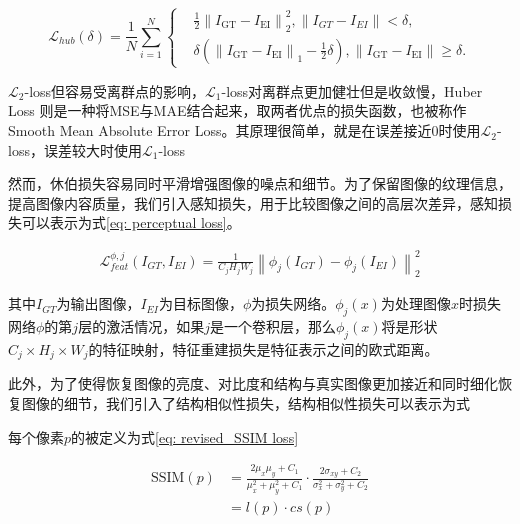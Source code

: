 \documentclass[a4paper]{ctexart}
\begin{document}
\begin{equation}
	\mathcal{L}_{hub}(\delta)= \frac{1}{N}\sum_{i=1}^{N}
	\left\{
	\begin{aligned}
		&\displaystyle{\frac{1}{2}{\left\|I_{\text{GT}} - I_{\text{EI}} \right\|}_2^{2}, \left\| I_{GT} -I_{EI} \right\| < \delta }, \\
		&\delta\left({\left\|I_{\text{GT}} - I_{\text{EI}} \right\|}_1 - \frac{1}{2}\delta \right), \left\| I_{\text{GT}} -I_{\text{EI}} \right\| \geq \delta.
	\end{aligned}
	\label{eq: huber loss}
	\right.
\end{equation}

$\mathcal{L}_2$-loss但容易受离群点的影响，$\mathcal{L}_1$-loss对离群点更加健壮但是收敛慢，Huber Loss 则是一种将MSE与MAE结合起来，取两者优点的损失函数，也被称作Smooth Mean Absolute Error Loss。其原理很简单，就是在误差接近0时使用$\mathcal{L}_2$-loss，误差较大时使用$\mathcal{L}_1$-loss

然而，休伯损失容易同时平滑增强图像的噪点和细节。为了保留图像的纹理信息，提高图像内容质量，我们引入感知损失，用于比较图像之间的高层次差异，感知损失可以表示为式\ref{eq: perceptual loss}。

\begin{equation}
	\begin{aligned}
		\mathcal{L}_{feat}^{\phi,j} (I_{GT},I_{EI}) = \frac{1}{C_{j}H_{j}W_{j}}{\left\| \phi_{j}(I_{GT})-\phi_{j}(I_{EI})\right\|}_{2}^2
	\end{aligned}
	\label{eq: perceptual loss}
\end{equation}

其中$I_{GT}$为输出图像，$I_{EI}$为目标图像，$\phi$为损失网络。$\phi_{j}(x)$为处理图像$x$时损失网络$\phi$的第$j$层的激活情况，如果$j$是一个卷积层，那么$\phi_{j}(x)$将是形状$C_{j} \times H_{j} \times W_{j}$的特征映射，特征重建损失是特征表示之间的欧式距离。

此外，为了使得恢复图像的亮度、对比度和结构与真实图像更加接近和同时细化恢复图像的细节，我们引入了结构相似性损失，结构相似性损失可以表示为式

每个像素$p$的被定义为式\ref{eq: revised_SSIM loss}

\begin{equation}
	\begin{aligned}
		\text{SSIM}(p) &= \frac{2\mu_{x}\mu_{y}+C_{1}}{\mu_{x}^2+\mu_{y}^2+C_{1}} \cdot \frac{2\sigma_{xy}+C_{2}}{\sigma_{x}^2+\sigma_{y}^{2}+C_{2}} \\
		&= l(p)\cdot cs(p)
	\end{aligned}
	\label{eq: SSIM}
\end{equation}
\end{document}
